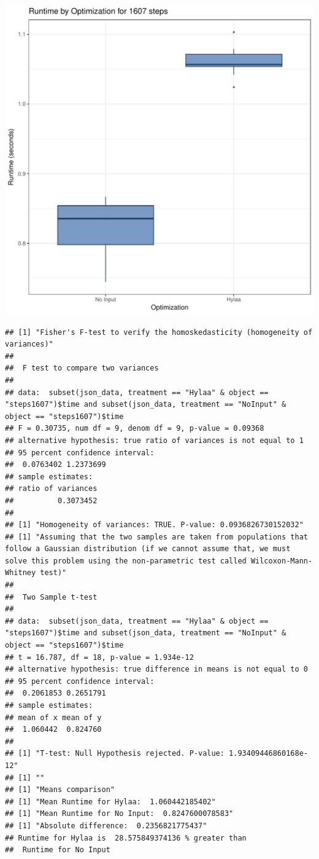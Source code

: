 \documentclass{article}\usepackage[]{graphicx}\usepackage[]{color}
\makeatletter
\def\maxwidth{ %
  \ifdim\Gin@nat@width>\linewidth
    \linewidth
  \else
    \Gin@nat@width
  \fi
}
\newenvironment{kframe}{%
 \def\at@end@of@kframe{}%
 \ifinner\ifhmode%
  \def\at@end@of@kframe{\end{minipage}}%
  \begin{minipage}{\columnwidth}%
 \fi\fi%
 \def\FrameCommand##1{\hskip\@totalleftmargin \hskip-\fboxsep
 \colorbox{shadecolor}{##1}\hskip-\fboxsep
     \hskip-\linewidth \hskip-\@totalleftmargin \hskip\columnwidth}%
 \MakeFramed {\advance\hsize-\width
   \@totalleftmargin\z@ \linewidth\hsize
   \@setminipage}}%
 {\par\unskip\endMakeFramed%
 \at@end@of@kframe}
\newenvironment{knitrout}{}{} %
\makeatother
\begin{document}
\begin{knitrout}
\color{fgcolor}
\includegraphics[width=\maxwidth]{figure/RH4_steps1607-1} 
\begin{kframe}\begin{verbatim}
## [1] "Fisher's F-test to verify the homoskedasticity (homogeneity of variances)"
## 
## 	F test to compare two variances
## 
## data:  subset(json_data, treatment == "Hylaa" & object == "steps1607")$time and subset(json_data, treatment == "NoInput" & object == "steps1607")$time
## F = 0.30735, num df = 9, denom df = 9, p-value = 0.09368
## alternative hypothesis: true ratio of variances is not equal to 1
## 95 percent confidence interval:
##  0.0763402 1.2373699
## sample estimates:
## ratio of variances 
##          0.3073452 
## 
## [1] "Homogeneity of variances: TRUE. P-value: 0.0936826730152032"
## [1] "Assuming that the two samples are taken from populations that follow a Gaussian distribution (if we cannot assume that, we must solve this problem using the non-parametric test called Wilcoxon-Mann-Whitney test)"
## 
## 	Two Sample t-test
## 
## data:  subset(json_data, treatment == "Hylaa" & object == "steps1607")$time and subset(json_data, treatment == "NoInput" & object == "steps1607")$time
## t = 16.787, df = 18, p-value = 1.934e-12
## alternative hypothesis: true difference in means is not equal to 0
## 95 percent confidence interval:
##  0.2061853 0.2651791
## sample estimates:
## mean of x mean of y 
##  1.060442  0.824760 
## 
## [1] "T-test: Null Hypothesis rejected. P-value: 1.93409446860168e-12"
## [1] ""
## [1] "Means comparison"
## [1] "Mean Runtime for Hylaa:  1.060442185402"
## [1] "Mean Runtime for No Input:  0.8247600078583"
## [1] "Absolute difference:  0.2356821775437"
## Runtime for Hylaa is  28.575849374136 % greater than 
##  Runtime for No Input
\end{verbatim}
\end{kframe}
\end{knitrout}
\end{document}
